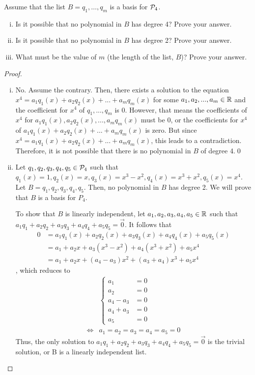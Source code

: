 \begin{question}
	\normalfont
	Assume that the list $B= q_1, \dots, q_m $ \hspace{.1cm} is a basis for $\P_4$.
	\begin{enumerate}[(i)]
		\item Is it possible that no polynomial in $B$ has degree 4? Prove your answer.
		\item Is it possible that no polynomial in $B$ has degree 2? Prove your answer.
		\item What must be the value of $m$ (the length of the list, $B$)?  Prove your answer. \\
	\end{enumerate}
\end{question}
\renewcommand{\qedsymbol}{$\blacksquare$}
\begin{proof}
    \begin{enumerate}[(i)]
        \item No. Assume the contrary. Then, there exists a solution to the equation $x^4=a_1q_1(x)+a_2q_2(x)+...+a_mq_m(x)$ for some $a_1,a_2,...,a_m\in\R$ and the coefficient for $x^4$ of $q_1,...,q_m$ is $0$.
        However, that means the coefficients of $x^4$ for $a_1q_1(x),a_2q_2(x),...,a_mq_m(x)$ must be 0, or the coefficients for $x^4$ of $a_1q_1(x)+a_2q_2(x)+...+a_mq_m(x)$ is zero. But since $x^4=a_1q_1(x)+a_2q_2(x)+...+a_mq_m(x)$, this leads to a contradiction. Therefore, it is not possible that there is no polynomial in $B$ of degree 4.\qed
        \item Let $q_1,q_2,q_3,q_4,q_5\in\P_4$ such that $q_1(x)=1,q_2(x)=x,q_3(x)=x^3-x^2,q_4(x)=x^3+x^2,q_5(x)=x^4$. Let $B=q_1,q_2,q_3,q_4,q_5$. Then, no polynomial in $B$ has degree 2. We will prove that $B$ is a basis for $P_4$.
        
        To show that $B$ is linearly independent, let $a_1,a_2,a_3,a_4,a_5\in\R$ such that $a_1q_1+a_2q_2+a_3q_3+a_4q_4+a_5q_5=\vec{0}$. It follows that 
        \[
            \begin{aligned}
                0
                &= a_1q_1(x)+a_2q_2(x)+a_3q_3(x)+a_4q_4(x)+a_5q_5(x)\\
                &= a_1+a_2x+a_3(x^3-x^2)+a_4(x^3+x^2)+a_5x^4\\
                &= a_1+a_2x+(a_4-a_3)x^2+(a_3+a_4)x^3+a_5x^4
            \end{aligned}
        \]
        , which reduces to
        \begin{align*}
            &\begin{cases}
                a_1 &= 0\\
                a_2 &= 0\\
                a_4-a_3 &= 0\\
                a_4+a_3 &= 0\\
                a_5 &= 0   
            \end{cases}\\\iff
            &a_1=a_2=a_3=a_4=a_5=0
        \end{align*}
        Thus, the only solution to $a_1q_1+a_2q_2+a_3q_3+a_4q_4+a_5q_5=\vec{0}$ is the trivial solution, or B is a linearly independent list.


\end{enumerate}
\end{proof}
